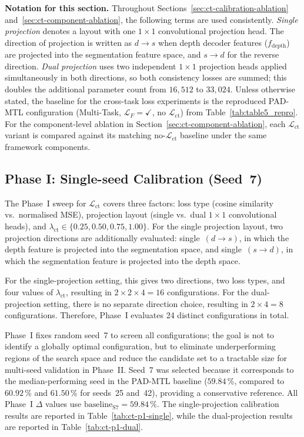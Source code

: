 \noindent
\textbf{Notation for this section.}
Throughout Sections~\ref{sec:ct-calibration-ablation}
and~\ref{sec:ct-component-ablation}, the following terms are used
consistently. \textit{Single projection} denotes a layout with one
$1{\times}1$ convolutional projection head. The direction of projection is
written as $d{\rightarrow}s$ when depth decoder features
($f_\text{depth}$) are projected into the segmentation feature space, and
$s{\rightarrow}d$ for the reverse direction. \textit{Dual projection} uses
two independent $1{\times}1$ projection heads applied simultaneously in
both directions, so both consistency losses are summed; this doubles the
additional parameter count from $16{,}512$ to $33{,}024$. Unless otherwise
stated, the baseline for the cross-task loss experiments is the reproduced
PAD-MTL configuration (Multi-Task, $\mathcal{L}_F=\checkmark$, no
$\mathcal{L}_\text{ct}$) from Table~\ref{tab:table5_repro}. For the
component-level ablation in Section~\ref{sec:ct-component-ablation}, each
$\mathcal{L}_\text{ct}$ variant is compared against its matching
no-$\mathcal{L}_\text{ct}$ baseline under the same framework components.

\subsection{Phase I: Single-seed Calibration (Seed~7)}
\label{subsec:ct-phase1-seed7}

\noindent
The Phase~I sweep for $\mathcal{L}_\text{ct}$ covers three factors:
loss type (cosine similarity vs.\ normalised MSE), projection layout
(single vs.\ dual $1{\times}1$ convolutional heads), and
$\lambda_\text{ct}\in\{0.25, 0.50, 0.75, 1.00\}$. For the single
projection layout, two projection directions are additionally evaluated:
single~$(d{\rightarrow}s)$, in which the depth feature is projected into
the segmentation space, and single~$(s{\rightarrow}d)$, in which the
segmentation feature is projected into the depth space.

For the single-projection setting, this gives two directions, two loss
types, and four values of $\lambda_\text{ct}$, resulting in
$2 \times 2 \times 4 = 16$ configurations. For the dual-projection
setting, there is no separate direction choice, resulting in
$2 \times 4 = 8$ configurations. Therefore, Phase~I evaluates
24 distinct configurations in total.

Phase~I fixes random seed~7 to screen all configurations; the goal is
not to identify a globally optimal configuration, but to eliminate
underperforming regions of the search space and reduce the candidate
set to a tractable size for multi-seed validation in Phase~II.
Seed~7 was selected because it corresponds to the median-performing seed
in the PAD-MTL baseline ($59.84$\,\%, compared to $60.92$\,\% and
$61.50$\,\% for seeds~25 and~42), providing a conservative reference.
All Phase~I $\Delta$ values use $\text{baseline}_{\text{S7}} = 59.84$\,\%.
The single-projection calibration results are reported in
Table~\ref{tab:ct-p1-single}, while the dual-projection results are
reported in Table~\ref{tab:ct-p1-dual}.

